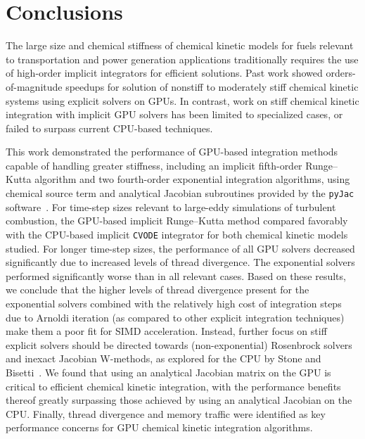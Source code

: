 \documentclass[preprint]{elsarticle}
\begin{document}
\section{Conclusions}
\label{S:conclusions}

The large size and chemical stiffness of chemical kinetic models for fuels relevant to transportation and power generation applications traditionally requires the use of high-order implicit integrators for efficient solutions.
Past work showed orders-of-magnitude speedups for solution of nonstiff to moderately stiff chemical kinetic systems using explicit solvers on GPUs.
In contrast, work on stiff chemical kinetic integration with implicit GPU solvers has been limited to specialized cases, or failed to surpass current CPU-based techniques.

This work demonstrated the performance of GPU-based integration methods capable of handling greater stiffness, including an implicit fifth-order Runge--Kutta algorithm and two fourth-order exponential integration algorithms, using chemical source term and analytical Jacobian subroutines provided by the \texttt{pyJac} software~\cite{niemeyer_2016_51139,Niemeyer:2015ws,Niemeyer:2016aa}.
For time-step sizes relevant to large-eddy simulations of turbulent combustion, the GPU-based implicit Runge--Kutta method compared favorably with the CPU-based implicit \texttt{CVODE} integrator for both chemical kinetic models studied.
For longer time-step sizes, the performance of all GPU solvers decreased significantly due to increased levels of thread divergence.
The exponential solvers performed significantly worse than  in all relevant cases.
Based on these results, we conclude that the higher levels of thread divergence present for the exponential solvers combined with the relatively high cost of integration steps due to Arnoldi iteration (as compared to other explicit integration techniques) make them a poor fit for SIMD acceleration.
Instead, further focus on stiff explicit solvers should be directed towards (non-exponential) Rosenbrock solvers and inexact Jacobian W-methods, as explored for the CPU by Stone and Bisetti~\cite{stone2014comparison}.
We found that using an analytical Jacobian matrix on the GPU is critical to efficient chemical kinetic integration, with the performance benefits thereof greatly surpassing those achieved by using an analytical Jacobian on the CPU.
Finally, thread divergence and memory traffic were identified as key performance concerns for GPU chemical kinetic integration algorithms.
\end{document}
